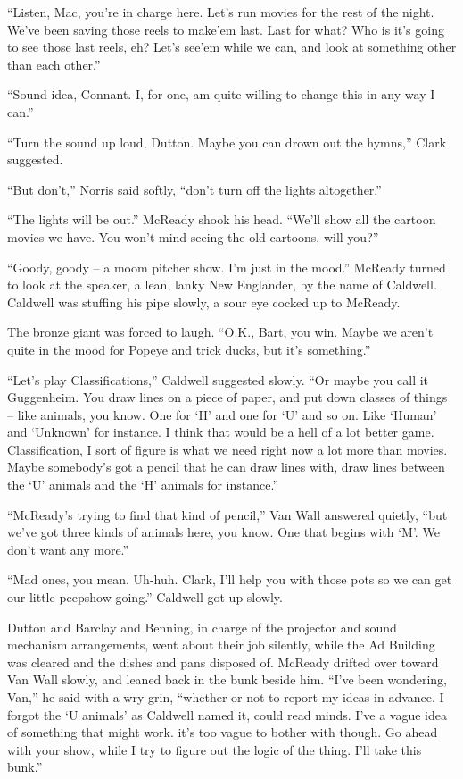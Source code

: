\documentclass[letterpaper,openany,12pt]{memoir}		%
\begin{document}
``Listen, Mac, you're in charge here. Let's run movies for the rest of the
night. We've been saving those reels to make'em last. Last for what? Who is it's
going to see those last reels, eh? Let's see'em while we can, and look at
something other than each other.''

``Sound idea, Connant. I, for one, am quite willing to change this in any way I
can.''

``Turn the sound up loud, Dutton. Maybe you can drown out the hymns,'' Clark
suggested.

``But don't,'' Norris said softly, ``don't turn off the lights altogether.''

``The lights will be out.'' McReady shook his head. ``We'll show all the cartoon
movies we have. You won't mind seeing the old cartoons, will you?''

``Goody, goody -- a moom pitcher show. I'm just in the mood.'' McReady turned to
look at the speaker, a lean, lanky New Englander, by the name of Caldwell.
Caldwell was stuffing his pipe slowly, a sour eye cocked up to McReady.

The bronze giant was forced to laugh. ``O.K., Bart, you win. Maybe we aren't
quite in the mood for Popeye and trick ducks, but it's something.''

``Let's play Classifications,'' Caldwell suggested slowly. ``Or maybe you call
it Guggenheim. You draw lines on a piece of paper, and put down classes of
things -- like animals, you know. One for `H' and one for `U' and so on. Like
`Human' and `Unknown' for instance. I think that would be a hell of a lot better
game. Classification, I sort of figure is what we need right now a lot more than
movies. Maybe somebody's got a pencil that he can draw lines with, draw lines
between the `U' animals and the `H' animals for instance.''

``McReady's trying to find that kind of pencil,'' Van Wall answered quietly,
``but we've got three kinds of animals here, you know. One that begins with `M'.
We don't want any more.''

``Mad ones, you mean. Uh-huh. Clark, I'll help you with those pots so we can get
our little peepshow going.'' Caldwell got up slowly.

Dutton and Barclay and Benning, in charge of the projector and sound mechanism
arrangements, went about their job silently, while the Ad Building was cleared
and the dishes and pans disposed of. McReady drifted over toward Van Wall
slowly, and leaned back in the bunk beside him. ``I've been wondering, Van,'' he
said with a wry grin, ``whether or not to report my ideas in advance. I forgot
the `U animals' as Caldwell named it, could read minds. I've a vague idea of
something that might work. it's too vague to bother with though. Go ahead with
your show, while I try to figure out the logic of the thing. I'll take this
bunk.''
\end{document}
